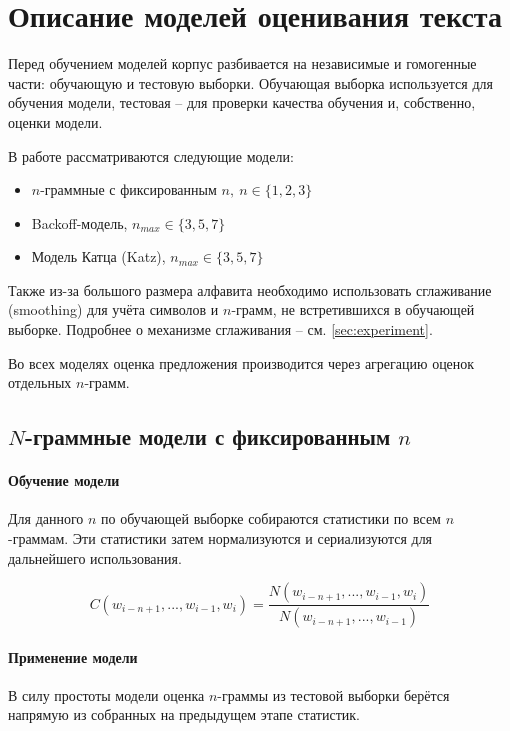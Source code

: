 \section{ Описание моделей оценивания текста }\label{sec:models}

Перед обучением моделей корпус разбивается на независимые и гомогенные части: обучающую и тестовую выборки. Обучающая выборка используется для обучения модели, тестовая -- для проверки качества обучения и, собственно, оценки модели.

В работе рассматриваются следующие модели: 

\begin{itemize}
	\item $n$-граммные с фиксированным $n,\ n \in \{1,2,3\}$
	
	\item Backoff-модель, $n_{max} \in \{ 3, 5, 7 \}$
	
	\item Модель Катца (Katz),  $n_{max} \in \{ 3, 5, 7 \}$
\end{itemize}

Также из-за большого размера алфавита необходимо использовать сглаживание (smoothing) для учёта символов и $n$-грамм, не встретившихся в обучающей выборке. Подробнее о механизме сглаживания -- см. \cref{sec:experiment}.

Во всех моделях оценка предложения производится через агрегацию оценок отдельных $n$-грамм.

\subsection{ $N$-граммные модели с фиксированным $n$ }

\paragraph{ Обучение модели } Для данного $n$ по обучающей выборке собираются статистики по всем $n$-граммам. Эти статистики затем нормализуются и сериализуются для дальнейшего использования.

$$ C(w_{i - n + 1}, ..., w_{i - 1}, w_i) = \dfrac{N(w_{i - n + 1}, ..., w_{i - 1}, w_i)}{N(w_{i - n + 1}, ..., w_{i - 1})} $$ 

\paragraph{ Применение модели } В силу простоты модели оценка $n$-граммы из тестовой выборки берётся напрямую из собранных на предыдущем этапе статистик.

